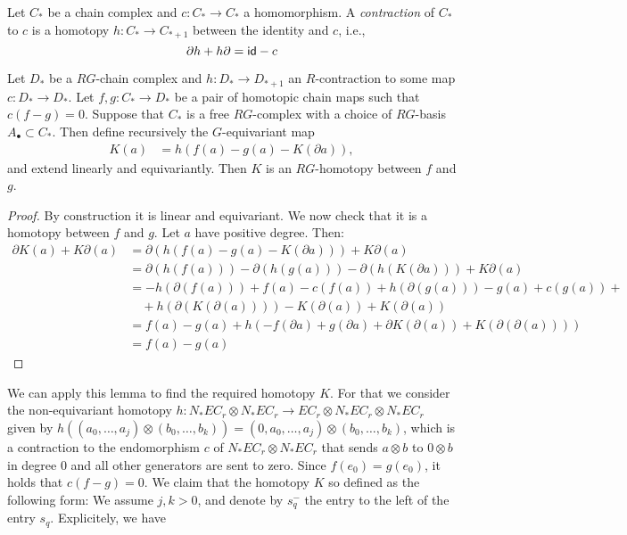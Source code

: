 \begin{definition} Let $C_*$ be a chain complex and $c\colon C_*\to C_*$ a homomorphism. A \emph{contraction} of $C_*$ to $c$ is a homotopy $h\colon C_*\to C_{*+1}$ between the identity and $c$, i.e.,
\[\partial h + h\partial = \mathsf{id}-c\] 
\end{definition}
\begin{lemma} Let $D_*$ be a $RG$-chain complex and $h\colon D_*\to D_{*+1}$ an $R$-contraction to some map $c\colon D_*\to D_*$. Let $f,g\colon C_*\to D_*$ be a pair of homotopic chain maps such that $c(f-g) = 0$. Suppose that $C_*$ is a free $RG$-complex with a choice of $RG$-basis $A_\bullet\subset C_*$. Then define recursively the $G$-equivariant map
\begin{align*}
K(a) &= h(f(a)-g(a)-K(\partial a)),
\end{align*} 
and extend linearly and equivariantly. Then $K$ is an $RG$-homotopy between $f$ and $g$.
\end{lemma}
\begin{proof} By construction it is linear and equivariant. We now check that it is a homotopy between $f$ and $g$. Let $a$ have positive degree. Then:
\begin{align*}
\partial K(a) + K\partial(a) 
&= \partial(h(f(a)-g(a)-K(\partial a))) + K\partial(a) \\
&= \partial(h(f(a)))-\partial(h(g(a)))-\partial(h(K(\partial a))) + K\partial(a) \\
&= -h(\partial(f(a))) + f(a) -c(f(a))+ h(\partial(g(a))) - g(a)+c(g(a))  + \\
&\quad + h(\partial(K(\partial(a)))) - K(\partial(a)) + K(\partial(a)) \\
&= f(a) - g(a) + h\left(-f(\partial a) + g(\partial a) + \partial K(\partial(a)) + K(\partial(\partial(a)))\right) \\
&= f(a) - g(a)
\end{align*}
\end{proof}
We can apply this lemma to find the required homotopy $K$. For that we consider the non-equivariant homotopy $h\colon N_*EC_r\otimes N_*EC_r\to EC_r\otimes N_*EC_r\otimes N_*EC_r$ given by $h((a_0,\ldots,a_j)\otimes(b_0,\ldots,b_k)) = (0,a_0,\ldots,a_j)\otimes(b_0,\ldots,b_k)$, which is a contraction to the endomorphism $c$ of $N_*EC_r\otimes N_*EC_r$ that sends $a\otimes b$ to $0\otimes b$ in degree $0$ and all other generators are sent to zero. Since $f(e_0) = g(e_0)$, it holds that $c(f-g) = 0$. We claim that the homotopy $K$ so defined as the following form: We assume $j,k>0$, and denote by $s_q^-$ the entry to the left of the entry $s_q$. Explicitely, we have 
